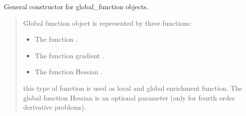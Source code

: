 \documentclass[a4paper,11pt,english]{sphinxmanual}
\begin{document}
\sphinxAtStartPar
{}

\sphinxAtStartPar
General constructor for global\_function objects.
\begin{quote}

\sphinxAtStartPar
Global function object is represented by three functions:
\begin{itemize}
\item {} 
\sphinxAtStartPar
The function .

\item {} 
\sphinxAtStartPar
The function gradient .

\item {} 
\sphinxAtStartPar
The function Hessian .

\end{itemize}

\sphinxAtStartPar
this type of function is used as local and global enrichment function. The
global function Hessian is an optional parameter (only for fourth order
derivative problems).
\end{quote}
\end{document}
